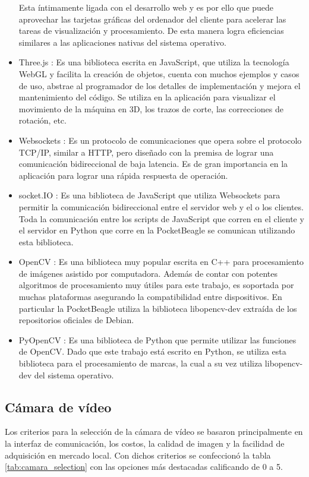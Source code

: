 \begin{itemize}
{         Esta íntimamente ligada con el desarrollo web y es por ello que puede aprovechar las tarjetas gráficas del ordenador del cliente para acelerar las tareas de visualización y procesamiento.
         De esta manera logra eficiencias similares a las aplicaciones nativas del sistema operativo.
      }
      \item{Three.js \citep{WEBSITE:threejs}: Es una biblioteca escrita en JavaScript, que utiliza la tecnología WebGL y facilita la creación de objetos, cuenta con muchos ejemplos y casos de uso, abstrae al programador de los detalles de implementación y mejora el mantenimiento del código.
         Se utiliza en la aplicación para visualizar el movimiento de la máquina en 3D, los trazos de corte, las correcciones de rotación, etc.
      }
      \item{Websockets \citep{WEBSITE:websockets}: Es un protocolo de comunicaciones que opera sobre el protocolo TCP/IP, similar a HTTP, pero diseñado con la premisa de lograr una comunicación bidireccional de baja latencia.
         Es de gran importancia en la aplicación para lograr una rápida respuesta de operación.
      }
      \item{socket.IO \citep{WEBSITE:socketio}: Es una biblioteca de JavaScript que utiliza Websockets para permitir la comunicación bidireccional entre el servidor web y el o los clientes.
         Toda la comunicación entre los scripts de JavaScript que corren en el cliente y el servidor en Python que corre en la PocketBeagle se comunican utilizando esta biblioteca.
      }
   \item{OpenCV \citep{WEBSITE:opencv}: Es una biblioteca muy popular escrita en C++ para procesamiento de imágenes asistido por computadora.
         Además de contar con potentes algoritmos de procesamiento muy útiles para este trabajo, es soportada por muchas plataformas asegurando la compatibilidad entre dispositivos.
         En particular la PocketBeagle utiliza la biblioteca libopencv-dev extraída de los repositorios oficiales de Debian.
      }
   \item{PyOpenCV \citep{WEBSITE:pyopencv}: Es una biblioteca de Python que permite utilizar las funciones de OpenCV.
         Dado que este trabajo está escrito en Python, se utiliza esta biblioteca para el procesamiento de marcas, la cual a su vez utiliza libopencv-dev del sistema operativo.
      }
\end{itemize}

\subsection{Cámara de vídeo}
\label{subsection:camara_de_video}
   Los criterios para la selección de la cámara de vídeo se basaron principalmente en la interfaz de comunicación, los costos, la calidad de imagen y la facilidad de adquisición en mercado local. 
   Con dichos criterios se confeccionó la tabla \ref{tab:camara_selection} con las opciones más destacadas calificando de 0 a 5.

